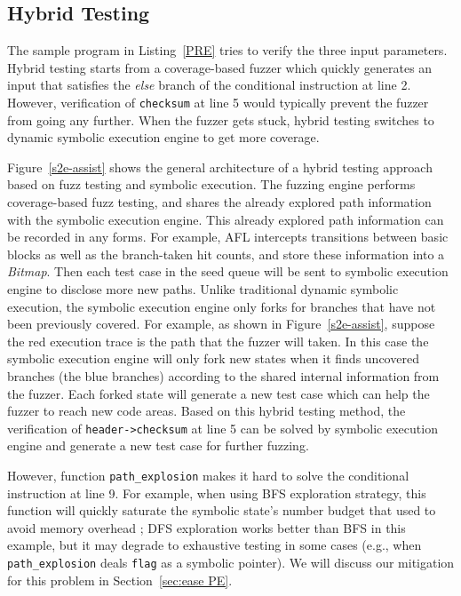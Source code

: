 \documentclass{cta-author}
\begin{document}
\subsection{Hybrid Testing}

The sample program in Listing~\ref{PRE} tries to verify the three input
parameters. Hybrid testing starts from a coverage-based fuzzer which
quickly generates an input that satisfies the \textit{else} branch
of the conditional instruction at line 2. However, verification of
\texttt{checksum} at line 5 would typically prevent the fuzzer from
going any further. When the fuzzer gets stuck, hybrid testing switches to
dynamic symbolic execution engine to get more coverage.



Figure~\ref{s2e-assist} shows the general architecture of a hybrid testing
approach based on fuzz testing and symbolic execution. The fuzzing engine 
performs coverage-based fuzz testing, and shares the already explored 
path information with the symbolic execution engine. This already explored 
path information can be recorded in any forms. For example, AFL 
intercepts transitions between basic blocks as well as the branch-taken 
hit counts, and store these information into a \textit{Bitmap}.
Then each test case in the seed queue will be sent to symbolic execution 
engine to disclose more new paths.
Unlike traditional dynamic symbolic execution, the symbolic execution engine
only forks for branches that have not been previously covered. For
example, as shown in Figure~\ref{s2e-assist}, suppose the red execution
trace is the path that the fuzzer will taken. In this case the symbolic
execution engine will only fork new states when it finds uncovered
branches (the blue branches) according to the shared internal
information from the fuzzer. Each forked state will generate a new test
case which can help the fuzzer to reach new code areas. Based on this
hybrid testing method, the verification of \texttt{header->checksum} at
line 5 can be solved by symbolic execution engine and generate a new
test case for further fuzzing.

However, function \texttt{path\_explosion} makes it hard to solve the 
conditional instruction at line 9. For example, when using BFS exploration 
strategy, this function will quickly saturate the symbolic state's number 
budget that used to avoid memory overhead \cite{stephens2016driller}; DFS 
exploration works better than BFS in this example, but it may degrade to 
exhaustive testing in some cases (e.g., when \texttt{path\_explosion} deals
\texttt{flag} as a symbolic pointer). 
We will discuss our mitigation
for this problem in Section~\ref{sec:ease PE}.
\end{document}
